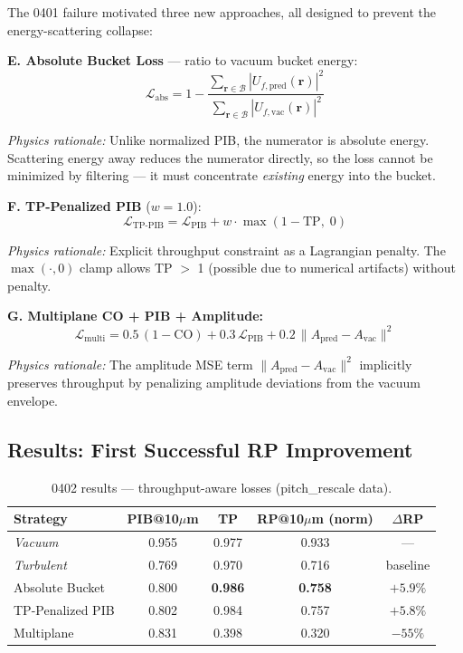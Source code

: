\documentclass[11pt,a4paper]{article}
\begin{document}
The 0401 failure motivated three new approaches, all designed to prevent the energy-scattering collapse:

\noindent\textbf{E. Absolute Bucket Loss} --- ratio to vacuum bucket energy:
\begin{equation}
\mathcal{L}_{\mathrm{abs}} = 1 - \frac{\sum_{\mathbf{r} \in \mathcal{B}} |U_{f,\mathrm{pred}}(\mathbf{r})|^2}{\sum_{\mathbf{r} \in \mathcal{B}} |U_{f,\mathrm{vac}}(\mathbf{r})|^2}
\label{eq:abs_bucket}
\end{equation}

\textit{Physics rationale:} Unlike normalized PIB, the numerator is absolute energy. Scattering energy away reduces the numerator directly, so the loss cannot be minimized by filtering --- it must concentrate \textit{existing} energy into the bucket.

\noindent\textbf{F. TP-Penalized PIB} ($w = 1.0$):
\begin{equation}
\mathcal{L}_{\mathrm{TP\text{-}PIB}} = \mathcal{L}_{\mathrm{PIB}} + w \cdot \max(1 - \mathrm{TP},\; 0)
\end{equation}

\textit{Physics rationale:} Explicit throughput constraint as a Lagrangian penalty. The $\max(\cdot, 0)$ clamp allows TP $>$ 1 (possible due to numerical artifacts) without penalty.

\noindent\textbf{G. Multiplane CO + PIB + Amplitude:}
\begin{equation}
\mathcal{L}_{\mathrm{multi}} = 0.5\,(1 - \mathrm{CO}) + 0.3\,\mathcal{L}_{\mathrm{PIB}} + 0.2\,\|A_{\mathrm{pred}} - A_{\mathrm{vac}}\|^2
\end{equation}

\textit{Physics rationale:} The amplitude MSE term $\|A_{\mathrm{pred}} - A_{\mathrm{vac}}\|^2$ implicitly preserves throughput by penalizing amplitude deviations from the vacuum envelope.

\subsection{Results: First Successful RP Improvement}

\begin{table}[H]
\centering
\caption{0402 results --- throughput-aware losses (pitch\_rescale data).}
\begin{tabular}{l c c c c}
\toprule
Strategy & PIB@10$\mu$m & TP & RP@10$\mu$m (norm) & $\Delta$RP \\
\midrule
\textit{Vacuum} & 0.955 & 0.977 & 0.933 & --- \\
\textit{Turbulent} & 0.769 & 0.970 & 0.716 & baseline \\
\midrule
Absolute Bucket & 0.800 & \textbf{0.986} & \textbf{0.758} & \textcolor{positive}{$+5.9\%$} \\
TP-Penalized PIB & 0.802 & 0.984 & 0.757 & \textcolor{positive}{$+5.8\%$} \\
Multiplane & 0.831 & 0.398 & 0.320 & \textcolor{negative}{$-55\%$} \\
\bottomrule
\end{tabular}
\end{table}
\end{document}
